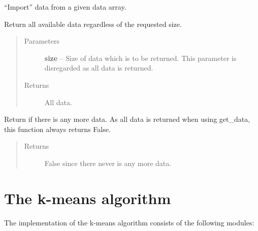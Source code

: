 \documentclass[letterpaper,10pt,english]{sphinxmanual}
\begin{document}
\begin{fulllineitems}
\label{common:common_data_importer.CommonSimpleDataImporter}
``Import'' data from a given data array.

\begin{fulllineitems}
\label{common:common_data_importer.CommonSimpleDataImporter.get_data}
Return all available data regardless of the requested size.
\begin{quote}\begin{description}
\item[{Parameters}] \leavevmode
\textbf{size} -- Size of data which is to be returned. This parameter is disregarded as all data is returned.

\item[{Returns}] \leavevmode
All data.

\end{description}\end{quote}

\end{fulllineitems}


\begin{fulllineitems}
\label{common:common_data_importer.CommonSimpleDataImporter.has_more_data}
Return if there is any more data. As all data is returned when using get\_data, this function always returns False.
\begin{quote}\begin{description}
\item[{Returns}] \leavevmode
False since there never is any more data.

\end{description}\end{quote}

\end{fulllineitems}


\end{fulllineitems}



\chapter{The k-means algorithm}
\label{kmeans::doc}\label{kmeans:the-k-means-algorithm}
The implementation of the k-means algorithm consists of the following modules:
\end{document}

